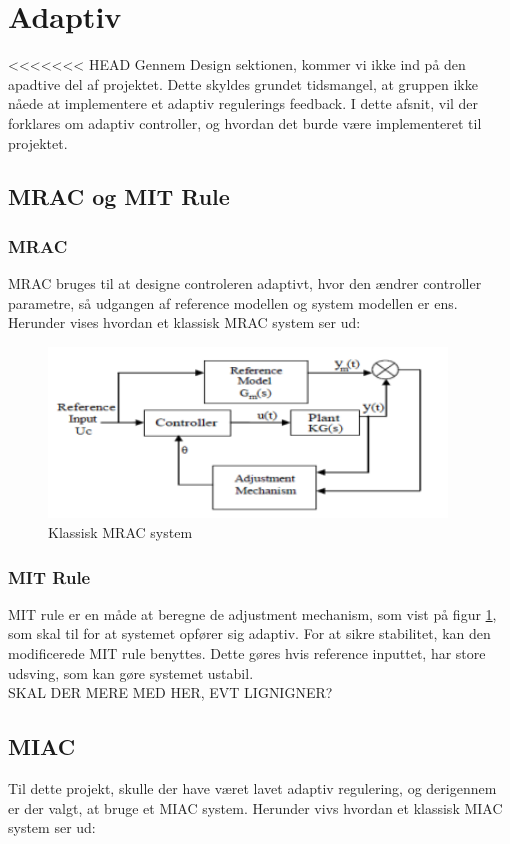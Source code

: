 \section{Adaptiv}

<<<<<<< HEAD
Gennem Design sektionen, kommer vi ikke ind på den apadtive del af projektet. Dette skyldes grundet tidsmangel, at gruppen ikke nåede at implementere et adaptiv regulerings feedback. I dette afsnit, vil der forklares om adaptiv controller, og hvordan det burde være implementeret til projektet. 

\subsection{MRAC og MIT Rule}
\subsubsection{MRAC}
MRAC bruges til at designe controleren adaptivt, hvor den ændrer controller parametre, så udgangen af reference modellen og system modellen er ens. 
Herunder vises hvordan et klassisk MRAC system ser ud:


\begin{figure}[H]
	\centering
	\includegraphics[width = 300pt]{figur/MRAC}
	\caption{Klassisk MRAC system}
	\label{fig:MRAC}
\end{figure}

\subsubsection{MIT Rule}
MIT rule er en måde at beregne de adjustment mechanism, som vist på figur \ref{fig:MRAC}, som skal til for at systemet opfører sig adaptiv. For at sikre stabilitet, kan den modificerede MIT rule benyttes. Dette gøres hvis reference inputtet, har store udsving, som kan gøre systemet ustabil. \\

SKAL DER MERE MED HER, EVT LIGNIGNER?

\subsection{MIAC}
Til dette projekt, skulle der have været lavet adaptiv regulering, og derigennem er der valgt, at bruge et MIAC system. Herunder vivs hvordan et klassisk MIAC system ser ud:

